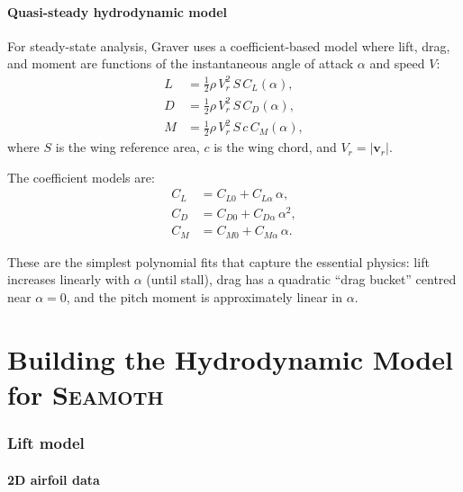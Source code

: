 \documentclass[11pt,a4paper]{article}
\newcommand{\seamoth}{\textsc{Seamoth}}
\newcommand{\half}{\tfrac{1}{2}}
\newcommand{\vect}[1]{\bm{#1}}
\begin{document}
\subsection{Quasi-steady hydrodynamic model}

For steady-state analysis, Graver uses a coefficient-based model where lift, drag,
and moment are functions of the instantaneous angle of attack $\alpha$ and speed $V$:
\begin{align}
  L &= \half\rho\,V_r^2\,S\,C_L(\alpha), \label{eq:L} \\
  D &= \half\rho\,V_r^2\,S\,C_D(\alpha), \label{eq:D} \\
  M &= \half\rho\,V_r^2\,S\,c\,C_M(\alpha), \label{eq:M}
\end{align}
where $S$ is the wing reference area, $c$ is the wing chord, and $V_r = |\vect{v}_r|$.

The coefficient models are:
\begin{align}
  C_L &= C_{L0} + C_{L\alpha}\,\alpha, \label{eq:CL} \\
  C_D &= C_{D0} + C_{D\alpha}\,\alpha^2, \label{eq:CD} \\
  C_M &= C_{M0} + C_{M\alpha}\,\alpha. \label{eq:CM}
\end{align}

These are the simplest polynomial fits that capture the essential physics: lift increases
linearly with $\alpha$ (until stall), drag has a quadratic ``drag bucket'' centred near
$\alpha=0$, and the pitch moment is approximately linear in $\alpha$.


\part{Building the Hydrodynamic Model for \seamoth{}}

\section{Lift model}
\label{sec:lift}

\subsection{2D airfoil data}
\end{document}
